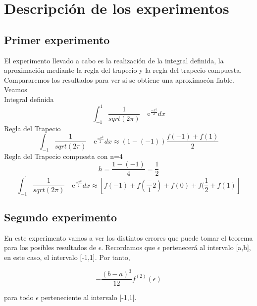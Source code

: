 


\section{Descripción de los experimentos}
\label{3:sec:1}
\parindent=0.5cm
\raggedright
\subsection{Primer experimento}
El experimento llevado a cabo es la realización de la integral definida, la aproximación
mediante la regla del trapecio y la regla del trapecio compuesta. Compararemos los resultados para ver si se obtiene una aproximacón fiable.
 Veamos\\
Integral definida 
\[
\int_{-1}^{1} \frac{1}{sqrt(2\pi)} \quad\text{e}^{\frac{-x^2}{2}}dx
\]
Regla del Trapecio
\[
\int_{-1}^{} \frac{1}{sqrt(2\pi)} \quad\text{e}^{\frac{-x^2}{2}}dx\approx\left(1-(-1)\right)\frac{f(-1)+f(1)}{2}
\]
Regla del Trapecio compuesta con n=4
\[
h=\frac{1-(-1)}{4} =\frac{1}{2} 
\]
\[
\int_{-1}^{1} \frac{1}{sqrt(2\pi)} \quad\text{e}^{\frac{-x^2}{2}}dx\approx\left[f(-1) + f(\frac-{1}{2}) + f(0) + f(\frac{1}{2} + f(1)\right]
\]


\subsection{Segundo experimento}
En este experimento vamos a ver los distintos errores que puede tomar el teorema para los posibles resultados de $\epsilon$.
Recordamos que $\epsilon$ pertenecerá al intervalo [a,b], en este caso, el intervalo [-1,1].
Por tanto,

\[
-\frac{\left(b-a\right)^3}{12}  \displaystyle f^{(2)}(\epsilon)
\]

para todo $\epsilon$ perteneciente al intervalo [-1,1].




